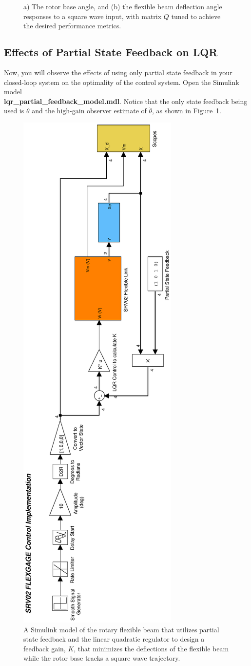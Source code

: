 \documentclass[12pt]{report}
\begin{document}
\begin{enumerate}
{\begin{figure}[htb!]
{                  }
              \caption{a) The rotor base angle, and (b) the flexible beam deflection angle responses to a square wave input, with matrix $Q$ tuned to achieve the desired performance metrics.}
          \end{figure}
          }
\end{enumerate}
\newpage
\subsection{Effects of Partial State Feedback on LQR}\label{subsubsection:lab4_partial_feedback}
Now, you will observe the effects of using only partial state feedback in your closed-loop system on the optimality of the control system. Open the Simulink model\\ \textbf{lqr\_partial\_feedback\_model.mdl}. Notice that the only state feedback being used is $\theta$ and the high-gain observer estimate of $\dot{\theta}$, as shown in Figure~\ref{lab4_lqr_partial_simulink}.
\begin{figure}[htb!]
    \includegraphics[width=0.3\linewidth,angle=-90]{eps/lab_4/lqr_partial_feedback_simulink}
    \caption{A Simulink model of the rotary flexible beam that utilizes partial state feedback and the linear quadratic regulator to design a feedback gain, $K$, that minimizes the deflections of the flexible beam while the rotor base tracks a square wave trajectory.}
    \label{lab4_lqr_partial_simulink}
\end{figure}
\end{document}
